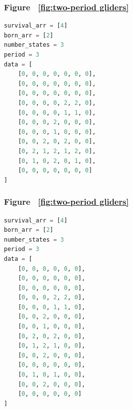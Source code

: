\documentclass[12pt]{article}
\numberwithin{figure}{section} %
\begin{document}
\noindent\begin{minipage}{.45\textwidth}
\subsubsection{Figure ~\ref{fig:two-period gliders}}
\label{subsubsection:two-period gliders(4/5)}
\begin{lstlisting}[language = Python]
survival_arr = [4]
born_arr = [2]
number_states = 3
period = 3
data = [
    [0, 0, 0, 0, 0, 0, 0],
    [0, 0, 0, 0, 0, 0, 0],
    [0, 0, 0, 0, 0, 0, 0],
    [0, 0, 0, 0, 2, 2, 0],
    [0, 0, 0, 0, 1, 1, 0],
    [0, 0, 0, 2, 0, 0, 0],
    [0, 0, 0, 1, 0, 0, 0],
    [0, 0, 2, 0, 2, 0, 0],
    [0, 2, 1, 2, 1, 2, 0],
    [0, 1, 0, 2, 0, 1, 0],
    [0, 0, 0, 0, 0, 0, 0]
]
\end{lstlisting}
\end{minipage}\hfill
\begin{minipage}{.45\textwidth}
\subsubsection{Figure ~\ref{fig:two-period gliders}}
\label{subsubsection:two-period gliders(5/5)}
\begin{lstlisting}[language = Python]
survival_arr = [4]
born_arr = [2]
number_states = 3
period = 3
data = [
    [0, 0, 0, 0, 0, 0],
    [0, 0, 0, 0, 0, 0],
    [0, 0, 0, 0, 0, 0],
    [0, 0, 0, 2, 2, 0],
    [0, 0, 0, 1, 1, 0],
    [0, 0, 2, 0, 0, 0],
    [0, 0, 1, 0, 0, 0],
    [0, 2, 0, 2, 0, 0],
    [0, 1, 2, 1, 0, 0],
    [0, 0, 2, 0, 0, 0],
    [0, 0, 0, 0, 0, 0],
    [0, 1, 0, 1, 0, 0],
    [0, 0, 2, 0, 0, 0],
    [0, 0, 0, 0, 0, 0]
]
\end{lstlisting}
\end{minipage}
\end{document}
